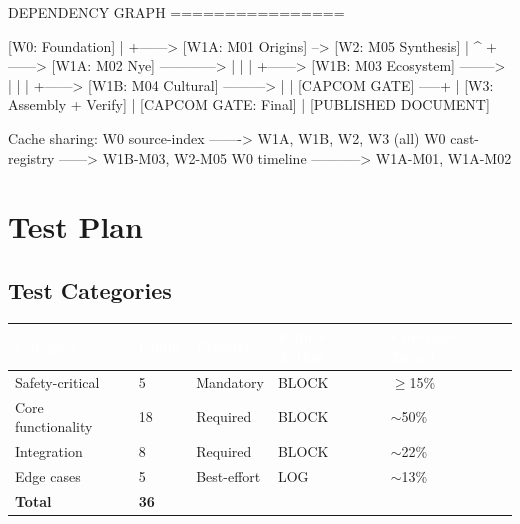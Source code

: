 \documentclass[11pt,letterpaper]{article}
\newcommand{\tableheader}[1]{\textbf{\sffamily\textcolor{white}{#1}}}
\begin{document}
\begin{asciibox}
DEPENDENCY GRAPH
================

  [W0: Foundation]
       |
       +------> [W1A: M01 Origins] --> [W2: M05 Synthesis]
       |                                       ^
       +------> [W1A: M02 Nye]  ------------>  |
       |                                       |
       +------> [W1B: M03 Ecosystem] -------->  |
       |                                       |
       +------> [W1B: M04 Cultural] --------->  |
                                               |
                            [CAPCOM GATE] -----+
                                               |
                                    [W3: Assembly + Verify]
                                               |
                                    [CAPCOM GATE: Final]
                                               |
                                    [PUBLISHED DOCUMENT]

  Cache sharing:
  W0 source-index -------> W1A, W1B, W2, W3 (all)
  W0 cast-registry ------> W1B-M03, W2-M05
  W0 timeline -----------> W1A-M01, W1A-M02
\end{asciibox}

\section{Test Plan}

\subsection{Test Categories}

\begin{center}
\begin{tabularx}{\textwidth}{L{3cm}C{1.5cm}L{2cm}L{2cm}X}
\toprule
{}
\tableheader{Category} & \tableheader{Count} & \tableheader{Priority} & \tableheader{Failure Action} & \tableheader{Coverage Target} \\
\midrule
Safety-critical & 5 & Mandatory & BLOCK & $\geq$15\% \\
Core functionality & 18 & Required & BLOCK & $\sim$50\% \\
Integration & 8 & Required & BLOCK & $\sim$22\% \\
Edge cases & 5 & Best-effort & LOG & $\sim$13\% \\
\midrule
\textbf{Total} & \textbf{36} & & & \\
\bottomrule
\end{tabularx}
\end{center}
\end{document}
